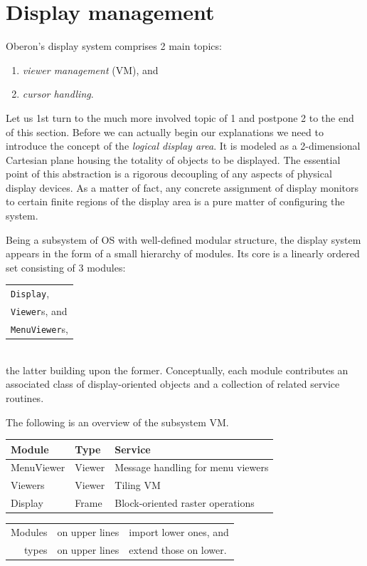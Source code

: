 \section{Display management}
\label{dispmanagement}
Oberon's display system comprises 2 main topics:
\begin{enumerate}
  \item \emph{viewer management} (VM), and
  \item \emph{cursor handling}.
\end{enumerate}
Let us 1st turn to the much more involved topic of 1 and postpone 2 to the end of this section.
Before we can actually begin our explanations
we need to introduce the concept of the \emph{logical display area}.
It is modeled as a 2-dimensional Cartesian plane
housing the totality of objects to be displayed.
The essential point of this abstraction is a rigorous decoupling
of any aspects of physical display devices.  As a matter of fact,
any concrete assignment of display monitors to certain finite regions of the display area
is a pure matter of configuring the system.

Being a subsystem of OS with well-defined modular structure,
the display system appears in the form of a small hierarchy of modules.
Its core is a linearly ordered set consisting of 3 modules:
\begin{table}[h!]
  \centering
  \begin{tabular}{l}
    \verb|Display|, \\
    \verb|Viewer|s, and \\
    \verb|MenuViewer|s,
  \end{tabular}
\end{table}
\\the latter building upon the former.  Conceptually, each module contributes
an associated class of display-oriented objects and a collection of related service routines.

The following is an overview of the subsystem VM.
\begin{table}[h!]
  \setlength{\tabcolsep}{2pt}
  \begin{tabular}{l|l|l}
    Module     &Type   &Service \\\hline
    MenuViewer &Viewer &Message handling for menu viewers \\
    Viewers    &Viewer &Tiling VM \\
    Display    &Frame  &Block-oriented raster operations
  \end{tabular}
\end{table}
\begin{table}[h!]
  \setlength{\tabcolsep}{2pt}
  \begin{tabular}{r l l}
    Modules&on upper lines&import lower ones, and \\
      types&on upper lines&extend those on lower.
  \end{tabular}
\end{table}

